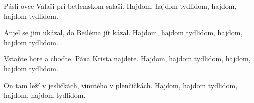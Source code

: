 \vskip-5mm
\IncludeLilypond

Pásli ovce Valaši pri betlemskom salaši.
Hajdom, hajdom tydlidom, hajdom, hajdom tydlidom.

Anjel se jim ukázal, do Betléma jít kázal.
Hajdom, hajdom tydlidom, hajdom, hajdom tydlidom.

Vstaňte hore a choďte, Pána Krista najdete.
Hajdom, hajdom tydlidom, hajdom, hajdom tydlidom.

On tam leží v jesličkách, vinutého v plenčičkách.
Hajdom, hajdom tydlidom, hajdom, hajdom tydlidom.
